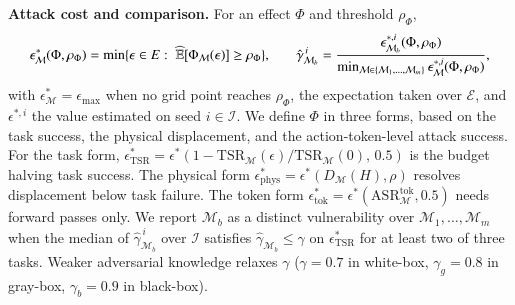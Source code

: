  \textbf{Attack cost and comparison.} For an effect $\Phi$ and threshold
$\rho_{\Phi}$,
\vspace{-1ex}\begin{equation}
  \small
\epsilon^{*}_{\mathcal{M}}(\Phi,\rho_{\Phi})=\min\bigl\{\epsilon\in E:\;
\widehat{\mathbb{E}}\bigl[\Phi_{\mathcal{M}}(\epsilon)\bigr]\ge\rho_{\Phi}\bigr\},
\qquad
\hat{\gamma}^{\,i}_{\mathcal{M}_{b}}=
\frac{\epsilon^{*,i}_{\mathcal{M}_{b}}(\Phi,\rho_{\Phi})}
{\min_{\mathcal{M}\in\{\mathcal{M}_{1},\dots,\mathcal{M}_{m}\}}
\epsilon^{*,i}_{\mathcal{M}}(\Phi,\rho_{\Phi})},
\label{eq:budget-operator}
\vspace{-1.5ex}\end{equation}
with $\epsilon^{*}_{\mathcal{M}}=\epsilon_{\max}$ when no grid point reaches $\rho_{\Phi}$, the expectation taken over $\mathcal{E}$, and $\epsilon^{*,i}$ the value estimated on seed $i\in\mathcal{I}$. 
We define $\Phi$ in three forms, based on the task success, the physical displacement, and the action-token-level attack success. For the task form, 
$\epsilon^{*}_{\mathrm{TSR}}=\epsilon^{*}(1-\mathrm{TSR}_{\mathcal{M}}(\epsilon)/
\mathrm{TSR}_{\mathcal{M}}(0),\,0.5)$ is the budget halving task success. 
The physical form $\epsilon^{*}_{\mathrm{phys}}=\epsilon^{*}(D_{\mathcal{M}}(H),
\rho)$ resolves displacement below task failure. The token form
$\epsilon^{*}_{\mathrm{tok}}=\epsilon^{*}(\mathrm{ASR}^{\mathrm{tok}}_{\mathcal{M}},
0.5)$ needs forward passes only.
We report $\mathcal{M}_{b}$ as a distinct vulnerability over $\mathcal{M}_{1},\dots,\mathcal{M}_{m}$ when the median of $\hat{\gamma}^{\,i}_{ \mathcal{M}_{b}}$ over $\mathcal{I}$ satisfies $\hat{\gamma}_{\mathcal{M}_{b}}\le\gamma$ on $\epsilon^{*}_{\mathrm{TSR}}$ for at least two of three tasks. Weaker adversarial knowledge relaxes $\gamma$ ($\gamma{=}0.7$ in white-box, $\gamma_{g}{=}0.8$ in gray-box, $\gamma_{b}{=}0.9$ in black-box).

